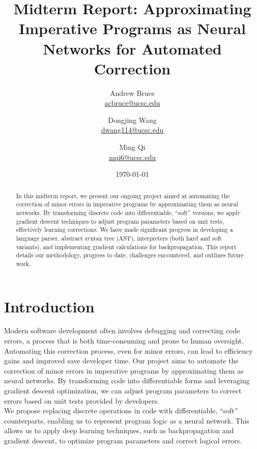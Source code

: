 \documentclass{article}
\title{Midterm Report: Approximating Imperative Programs as Neural Networks for Automated Correction}
\author{Andrew Bruce \\ \href{mailto:acbruce@ucsc.edu}{acbruce@ucsc.edu}
  \and Dongjing Wang \\ \href{mailto:dwang114@ucsc.edu}{dwang114@ucsc.edu}
  \and Ming Qi \\ \href{mailto:mqi6@ucsc.edu}{mqi6@ucsc.edu} }
\date{\today}
\begin{document}
\maketitle

\begin{abstract}
  \indent In this midterm report, we present our ongoing project aimed at automating the correction of minor errors in imperative programs by approximating them as neural networks. By transforming discrete code into differentiable, ``soft'' versions, we apply gradient descent techniques to adjust program parameters based on unit tests, effectively learning corrections. We have made significant progress in developing a language parser, abstract syntax tree (AST), interpreters (both hard and soft variants), and implementing gradient calculations for backpropagation. This report details our methodology, progress to date, challenges encountered, and outlines future work.
\end{abstract}

\section{Introduction}
\indent Modern software development often involves debugging and correcting code errors, a process that is both time-consuming and prone to human oversight. Automating this correction process, even for minor errors, can lead to efficiency gains and improved save developer time. Our project aims to automate the correction of minor errors in imperative programs by approximating them as neural networks. By transforming code into differentiable forms and leveraging gradient descent optimization, we can adjust program parameters to correct errors based on unit tests provided by developers.\\
\indent We propose replacing discrete operations in code with differentiable, ``soft'' counterparts, enabling us to represent program logic as a neural network. This allows us to apply deep learning techniques, such as backpropagation and gradient descent, to optimize program parameters and correct logical errors.
\end{document}
